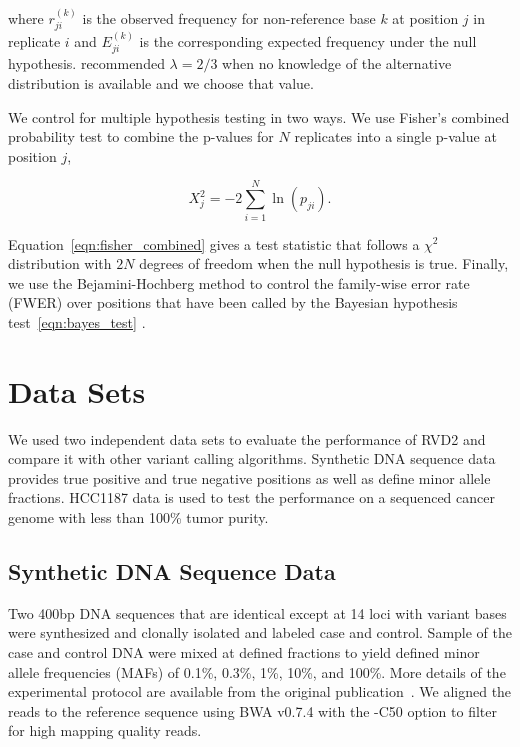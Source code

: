 \documentclass[11pt,reqno]{amsart}
\begin{document}
where $r_{ji}^{(k)}$ is the observed frequency for non-reference base $k$ at position $j$ in replicate $i$ and $E_{ji}^{(k)}$ is the corresponding expected frequency under the null hypothesis. \citet{Cressie1984} recommended $\lambda = 2/3$ when no knowledge of the alternative distribution is available and we choose that value.

We control for multiple hypothesis testing in two ways. We use Fisher's combined probability test \citep{} to combine the p-values for $N$ replicates into a single p-value at position $j$,

\begin{equation}\label{eqn:fisher_combined}
	X_j^2 = -2 \sum_{i=1}^N \ln(p_{ji}).
\end{equation}

Equation~\eqref{eqn:fisher_combined} gives a test statistic that follows a $\chi^2$ distribution with $2N$ degrees of freedom when the null hypothesis is true. Finally, we use the Bejamini-Hochberg method to control the family-wise error rate (FWER) over positions that have been called by the Bayesian hypothesis test~\eqref{eqn:bayes_test} \citep{}.


\section{Data Sets}

We used two independent data sets to evaluate the performance of RVD2 and compare it with other variant calling algorithms. Synthetic DNA sequence data provides true positive and true negative positions as well as define minor allele fractions. HCC1187 data is used to test the performance on a sequenced cancer genome with less than 100\% tumor purity.

\subsection{Synthetic DNA Sequence Data}

Two 400bp DNA sequences that are identical except at 14 loci with variant bases were synthesized and clonally isolated and labeled case and control. Sample of the case and control DNA were mixed at defined fractions to yield defined minor allele frequencies (MAFs) of 0.1\%, 0.3\%, 1\%, 10\%, and 100\%. More details of the experimental protocol are available from the original publication~\citep{Flaherty:2011ja}. We aligned the reads to the reference sequence using BWA v0.7.4 with the -C50 option to filter for high mapping quality reads.
\end{document}
